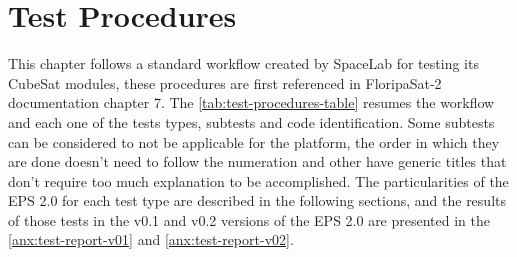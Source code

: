 %
%
%
%
%

%
%
%
%
%
%

\chapter{Test Procedures} \label{ch:test-procedures}

This chapter follows a standard workflow created by SpaceLab for testing its CubeSat modules, these procedures are first referenced in FloripaSat-2 documentation chapter 7\cite{floripasat2-doc}. The \autoref{tab:test-procedures-table} resumes the workflow and each one of the tests types, subtests and code identification. Some subtests can be considered to not be applicable for the platform, the order in which they are done doesn't need to follow the numeration and other have generic titles that don't require too much explanation to be accomplished. The particularities of the EPS 2.0 for each test type are described in the following sections, and the results of those tests in the v0.1 and v0.2 versions of the EPS 2.0 are presented in the \autoref{anx:test-report-v01} and \autoref{anx:test-report-v02}.

